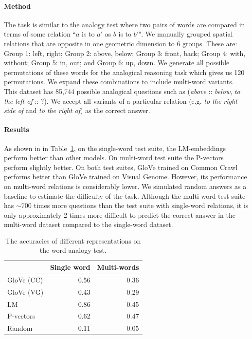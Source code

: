 \paragraph{Method}
The task is similar to the analogy test
\cite{mikolov2013distributed,levy2015improving} where two pairs of words are
compared in terms of some relation ``$a$ is to $a'$ as $b$ is to $b'$".
We manually grouped spatial relations that are opposite in one geometric
dimension to 6 groups.
These are: Group 1: left, right; Group 2: above, below; Group 3: front,
back; Group 4: with, without; Group 5: in, out; and Group 6: up, down.
We generate all possible permutations of these words for the analogical
reasoning task which gives us 120 permutations. We expand these combinations to
include multi-word variants. This dataset has 85,744 possible analogical
questions such as (\emph{above} :: \emph{below}, \emph{to the left of} :: ?).
We accept all variants of a particular relation (e.g.
\emph{to the right side of} and \emph{to the right of}) as the correct answer.




\paragraph{Results} As shown in in Table~\ref{splu2019:tab:analogy}, on the single-word
test suite, the LM-embeddings perform better than other models. On multi-word
test suite the P-vectors perform slightly better. On both test suites, GloVe
trained on Common Crawl performs better than GloVe trained on Visual Genome.
However, its performance on multi-word relations is considerably lower. We
simulated random answers as a baseline to estimate the difficulty of the task.
Although the multi-word test suite has $\sim 700$ times more questions than the
test suite with single-word relations, it is only approximately 2-times more
difficult to predict the correct answer in the multi-word dataset compared to
the single-word dataset.

\begin{table}
    \centering 
      \begin{tabular}{l|r|r}
              & Single word & Multi-words \\
      \hline
      GloVe (CC)   & 0.56 & 0.36 \\
      GloVe (VG)   & 0.43 & 0.29 \\
      \hline
      LM           & 0.86 & 0.45 \\
      P-vectors & 0.62 & 0.47 \\
      \hline
      Random       & 0.11 & 0.05 \\
      \end{tabular}
  	  \vspace{0.5em}
      \caption{The accuracies of different representations on the word analogy test.}
      \label{splu2019:tab:analogy}
      \vspace{-5mm}
\end{table}

